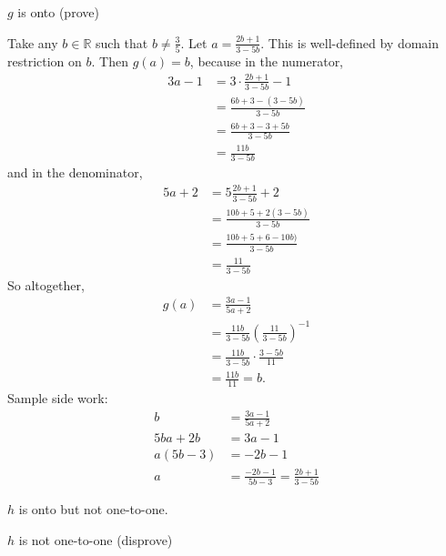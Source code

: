 \documentclass[12pt]{exam}
\begin{document}
\begin{solution}
\begin{qparts}
\begin{qsubparts}
        \item $g$ is onto (prove)

        Take any $b \in \mathbb R$ such that $b \neq \frac 35$. Let $a = \frac{2b + 1}{3 - 5b}$. This is well-defined by domain restriction on $b$. Then $g(a) = b$, because in the numerator,
        \begin{align*}
            3a - 1 
            &= 3 \cdot \frac{2b + 1}{3 - 5b} - 1 \tag{substitution} \\
            &= \frac{6b + 3 - (3 - 5b)}{3 - 5b} \tag{distribute} \\
            &= \frac{6b + 3 - 3 + 5b}{3 - 5b} \tag{distribute} \\
            &= \frac{11b}{3 - 5b} \tag{simplify}
        \end{align*}
        and in the denominator, 
        \begin{align*}
            5a + 2
            &= 5 \frac{2b + 1}{3 - 5b} + 2 \tag{substitution} \\
            &= \frac{10b + 5 + 2(3 - 5b)}{3 - 5b} \tag{distribute} \\
            &= \frac{10b + 5 + 6 - 10b)}{3 - 5b} \tag{distribute} \\
            &= \frac{11}{3 - 5b} \tag{simplify}
        \end{align*}
        So altogether, 
        \begin{align*}
            g(a)
            &= \frac{3a - 1}{5a + 2} \tag{definition of $g$} \\
            &= \frac{11b}{3 - 5b} \left(\frac{11}{3 - 5b}\right)^{-1} \tag{substitution} \\
            &= \frac{11b}{3 - 5b} \cdot \frac{3 - 5b}{11} \tag{distribute} \\
            &= \frac{11b}{11} = b. \tag{simplify}
        \end{align*}
        Sample side work:
        \begin{align*}
            b &= \frac{3a - 1}{5a + 2} \\
            5ba + 2b &= 3a - 1 \\
            a(5b - 3) &= -2b - 1 \\
            a &= \frac{-2b - 1}{5b - 3} = \frac{2b + 1}{3 - 5b}
        \end{align*}
    \end{qsubparts}

    \item $h$ is onto but not one-to-one.
    \begin{qsubparts}
        \item $h$ is not one-to-one (disprove)


\end{qsubparts}
\end{qparts}
\end{solution}
\end{document}
